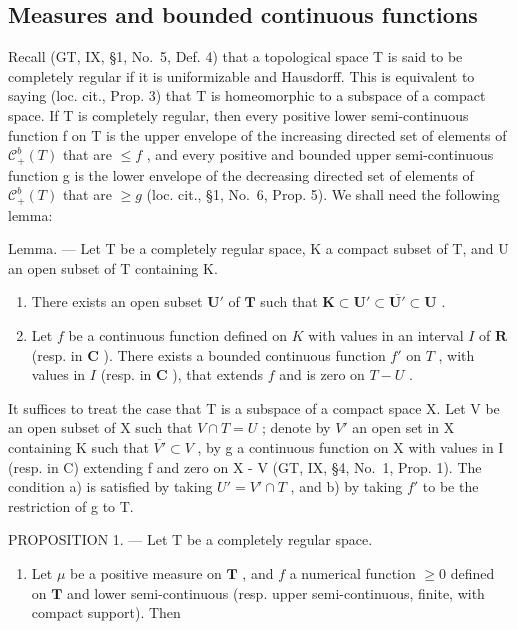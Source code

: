 \subsection{Measures and bounded continuous functions}

Recall (GT, IX, §1, No.~5, Def. 4) that a topological space T is said to be completely regular if it is uniformizable and Hausdorff. This is equivalent to saying (loc. cit., Prop. 3) that T is homeomorphic to a subspace of a compact space. If T is completely regular, then every positive lower semi-continuous function f on T is the upper envelope of the increasing directed set of elements of \(\mathcal{C}_{+}^{b}(T)\) that are \(\leqslant f\) , and every positive and bounded upper semi-continuous function g is the lower envelope of the decreasing directed set of elements of \(\mathcal{C}_{+}^{b}(T)\) that are \(\geqslant g\) (loc. cit., §1, No.~6, Prop. 5). We shall need the following lemma:

Lemma. --- Let T be a completely regular space, K a compact subset of T, and U an open subset of T containing K.

\begin{enumerate}
\def\labelenumi{\alph{enumi})}
\item
  There exists an open subset \(\mathbf{U}'\) of \(\mathbf{T}\) such that \(\mathbf{K} \subset \mathbf{U}' \subset \overline{\mathbf{U}'} \subset \mathbf{U}\) .
\item
  Let \(f\) be a continuous function defined on \(K\) with values in an interval \(I\) of \(\mathbf{R}\) (resp. in \(\mathbf{C}\) ). There exists a bounded continuous function \(f'\) on \(T\) , with values in \(I\) (resp. in \(\mathbf{C}\) ), that extends \(f\) and is zero on \(T - U\) .
\end{enumerate}

It suffices to treat the case that T is a subspace of a compact space X. Let V be an open subset of X such that \(V \cap T = U\) ; denote by \(V'\) an open set in X containing K such that \(\overline{V'} \subset V\) , by g a continuous function on X with values in I (resp. in C) extending f and zero on X - V (GT, IX, §4, No.~1, Prop. 1). The condition a) is satisfied by taking \(U' = V' \cap T\) , and b) by taking \(f'\) to be the restriction of g to T.

PROPOSITION 1. --- Let T be a completely regular space.

\begin{enumerate}
\def\labelenumi{\alph{enumi})}
\tightlist
\item
  Let \(\mu\) be a positive measure on \(\mathbf{T}\) , and \(f\) a numerical function \(\geqslant 0\) defined on \(\mathbf{T}\) and lower semi-continuous (resp. upper semi-continuous, finite, with compact support). Then
\end{enumerate}

